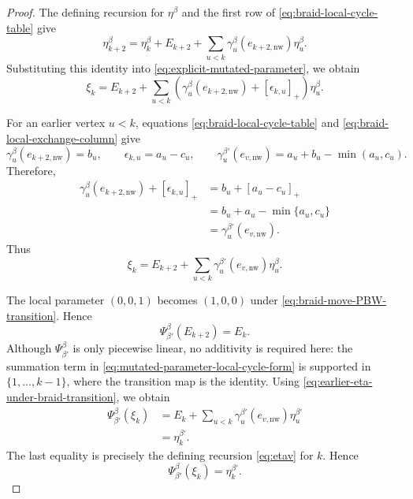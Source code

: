\documentclass[12pt, reqno]{amsart}
\theoremstyle{plain}
\theoremstyle{definition}
\numberwithin{equation}{section}
\begin{document}
\begin{proof}
The defining recursion for \(\eta^\beta\) and the first row of
\eqref{eq:braid-local-cycle-table} give
\[
    \eta_{k+2}^\beta
    =
    \eta_k^\beta
    +
    E_{k+2}
    +
    \sum_{u<k}
        \gamma_u^\beta(e_{k+2,\mathrm{nw}})
        \eta_u^\beta.
\]
Substituting this identity into
\eqref{eq:explicit-mutated-parameter}, we obtain
\begin{equation}\label{eq:mutated-parameter-before-transition}
    \xi_k
    =
    E_{k+2}
    +
    \sum_{u<k}
        \left(
            \gamma_u^\beta(e_{k+2,\mathrm{nw}})
            +
            [\epsilon_{k,u}]_+
        \right)
        \eta_u^\beta.
\end{equation}

For an earlier vertex \(u<k\), equations
\eqref{eq:braid-local-cycle-table} and
\eqref{eq:braid-local-exchange-column} give
\[
    \gamma_u^\beta(e_{k+2,\mathrm{nw}})=b_u,
    \qquad \epsilon_{k,u}=a_u-c_u,
    \qquad
    \gamma_u^{\beta'}(e_{v,\mathrm{nw}})
       =a_u+b_u-\min(a_u,c_u).
\]
Therefore,
\begin{align*}
    \gamma_u^\beta(e_{k+2,\mathrm{nw}})
    +
    [\epsilon_{k,u}]_+
    &=
    b_u+[a_u-c_u]_+\\
    &=
    b_u+a_u-\min\{a_u,c_u\}\\
    &=
    \gamma_{u}^{\beta'}(e_{v,\mathrm{nw}}).
\end{align*}
Thus
\begin{equation}\label{eq:mutated-parameter-local-cycle-form}
    \xi_k
    =
    E_{k+2}
    +
    \sum_{u<k}
        \gamma_{u}^{\beta'}(e_{v,\mathrm{nw}})
        \eta_u^\beta.
\end{equation}

The local parameter \((0,0,1)\) becomes \((1,0,0)\) under
\eqref{eq:braid-move-PBW-transition}. Hence
\[
    \Psi_{\beta'}^\beta(E_{k+2})=E_k.
\]
Although \(\Psi_{\beta'}^\beta\) is only piecewise linear, no
additivity is required here: the summation term in
\eqref{eq:mutated-parameter-local-cycle-form} is supported in
\(\{1,\ldots,k-1\}\), where the transition map is the identity.
Using \eqref{eq:earlier-eta-under-braid-transition}, we obtain
\begin{align*}
    \Psi_{\beta'}^\beta(\xi_k)
    &=
    E_k
    +
    \sum_{u<k}
        \gamma_{u}^{\beta'}(e_{v,\mathrm{nw}})
        \eta_{u}^{\beta'}\\
    &=
    \eta_k^{\beta'}.
\end{align*}
The last equality is precisely the defining recursion
\eqref{eq:etav} for \(k\). Hence
\begin{equation}\label{eq:braid-move-mutated-eta-transition}
    \Psi_{\beta'}^\beta(\xi_k)
    =
    \eta_{k}^{\beta'}.
\end{equation}


\end{proof}
\end{document}
